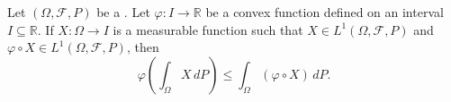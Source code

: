 \begin{proposition} \label{proposition:jensens_inequality_for_convex_functions_on_a_probability_measure_space}
Let $(\Omega, \mathcal{F}, P)$ be a . Let $\varphi : I \to \mathbb{R}$ be a convex function defined on an interval $I \subseteq \mathbb{R}$. If $X : \Omega \to I$ is a measurable function such that $X \in L^1(\Omega, \mathcal{F}, P)$ and $\varphi \circ X \in L^1(\Omega, \mathcal{F}, P)$, then
$$\varphi\left(\int_\Omega X\,dP\right) \leq \int_\Omega (\varphi \circ X)\,dP.$$
\end{proposition}
